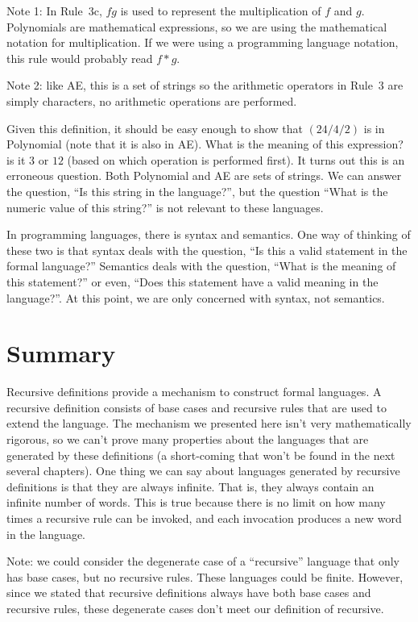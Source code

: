 \documentclass[letterpaper,12pt,openany,reqno]{book}%
\begin{document}
Note 1: In Rule~3c, $f g$ is used to represent the multiplication of $f$ and $g$. Polynomials are mathematical expressions, so we are using the mathematical notation for multiplication. If we were using a programming language notation, this rule would probably read $f*g$.

Note 2: like AE, this is a set of strings so the arithmetic operators in Rule~3 are simply characters, no arithmetic operations are performed. 

Given this definition, it should be easy enough to show that $(24/4/2)$ is in Polynomial (note that it is also in AE). What is the meaning of this expression? is it $3$ or $12$ (based on which operation is performed first). It turns out this is an erroneous question. Both Polynomial and AE are sets of strings. We can answer the question, ``Is this string in the language?'', but the question ``What is the numeric value of this string?'' is not relevant to these languages.

In programming languages, there is syntax and semantics. One way of thinking of these two is that syntax deals with the question, ``Is this a valid statement in the formal language?'' Semantics deals with the question, ``What is the meaning of this statement?'' or even, ``Does this statement have a valid meaning in the language?''. At this point, we are only concerned with syntax, not semantics.

\section{Summary}
Recursive definitions provide a mechanism to construct formal languages. A recursive definition consists of base cases and recursive rules that are used to extend the language. The mechanism we presented here isn't very mathematically rigorous, so we can't prove many properties about the languages that are generated by these definitions (a short-coming that won't be found in the next several chapters). One thing we can say about languages generated by recursive definitions is that they are always infinite. That is, they always contain an infinite number of words. This is true because there is no limit on how many times a recursive rule can be invoked, and each invocation produces a new word in the language.

Note: we could consider the degenerate case of a ``recursive'' language that only has base cases, but no recursive rules. These languages could be finite. However, since we stated that recursive definitions always have both base cases and recursive rules, these degenerate cases don't meet our definition of recursive.
\end{document}

